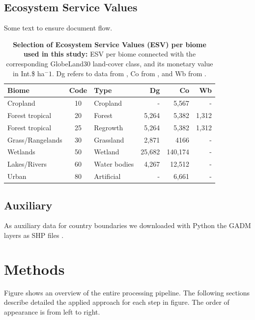 	\subsection{Ecosystem Service Values}
		Some text to ensure document flow.
		\begin{table}[ht]
			\centering
			\caption[Selection of Ecosystem Service Values (ESV) used in this study]{\textbf{Selection of Ecosystem Service Values (ESV) per biome used in this study:} ESV per biome connected with the corresponding GlobeLand30 land-cover class, and its monetary value in Int.\$ ha$^-1$. Dg refers to data from \citeauthor{Groot2012}, Co from \citeauthor{Costanza2014}, and Wb from \citeauthor{Siikamaki2015}.\citep{Groot2012,Costanza2014,Siikamaki2015}}
			\label{tab:esv}
			\begin{tabular}{lclrrr}
				\hline
				Biome & Code & Type & Dg & Co & Wb \\\hline
				Cropland & 10 & Cropland & - & 5,567 & -\\
				Forest tropical & 20 & Forest & 5,264 & 5,382 & 1,312\\
				Forest tropical & 25 & Regrowth & 5,264 & 5,382 & 1,312\\
				Grass/Rangelands & 30 & Grassland & 2,871 & 4166 & -\\
				Wetlands & 50 & Wetland & 25,682 & 140,174 & -\\
				Lakes/Rivers & 60 & Water bodies & 4,267 & 12,512 & -\\
				Urban & 80 & Artificial & - & 6,661 & -\\\hline
			\end{tabular}
		\end{table}

	\subsection{Auxiliary}
		As auxiliary data for country boundaries we downloaded with Python the \ac{GADM} layers as \ac{SHP} files \citep{Hijmans2018,Rossum2018}.

\section{Methods}
\label{sec:methods}
	Figure  shows an overview of the entire processing pipeline. The following sections describe detailed the applied approach for each step in figure. The order of appearance is from left to right. 

